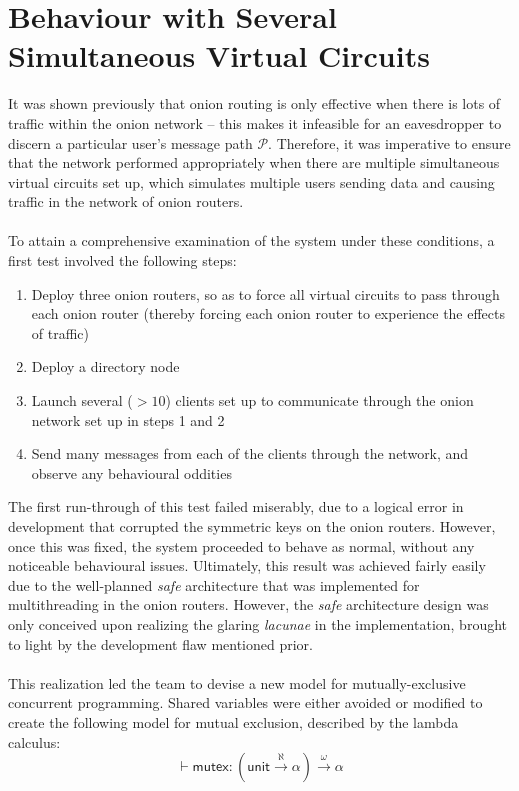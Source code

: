 \documentclass[10pt]{report}
\begin{document}
\section{Behaviour with Several Simultaneous Virtual Circuits}
It was shown previously that onion routing is only effective when there is lots of traffic within
the onion network -- this makes it infeasible for an eavesdropper to discern a particular user's
message path $\mathcal{P}$. Therefore, it was imperative to ensure that the network performed
appropriately when there are multiple simultaneous virtual circuits set up, which simulates multiple
users sending data and causing traffic in the network of onion routers.\\\\
To attain a comprehensive examination of the system under these conditions, a first test involved
the following steps:
\begin{enumerate}
	\item Deploy three onion routers, so as to force all virtual circuits to pass through each onion
		router (thereby forcing each onion router to experience the effects of traffic)
	\item Deploy a directory node
	\item Launch several ($>10$) clients set up to communicate through the onion network set up in
		steps 1 and 2
	\item Send many messages from each of the clients through the network, and observe any
		behavioural oddities
\end{enumerate}
The first run-through of this test failed miserably, due to a logical error in development that
corrupted the symmetric keys on the onion routers. However, once this was fixed, the system
proceeded to behave as normal, without any noticeable behavioural issues. Ultimately, this result
was achieved fairly easily due to the well-planned \textit{safe} architecture that was implemented
for multithreading in the onion routers. However, the \textit{safe} architecture design was only
conceived upon realizing the glaring \textit{lacunae} in the implementation, brought to light by the
development flaw mentioned prior.\\\\
This realization led the team to devise a new model for mutually-exclusive concurrent programming.
Shared variables were either avoided or modified to create the following model for mutual exclusion,
described by the lambda calculus:
\begin{equation}
	\vdash\mathsf{mutex}: (\mathsf{unit}\xrightarrow{\aleph}\alpha)\xrightarrow{\omega}\alpha
\end{equation}
\end{document}
